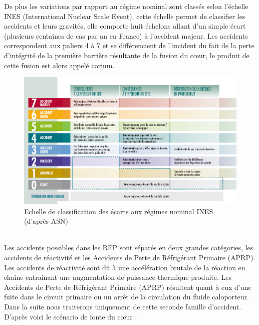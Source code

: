 \documentclass[a4paper,11pt,fleqn]{report}    %
\begin{document}
De plus les variations par rapport au régime nominal sont classés selon l'échelle INES (International Nuclear Scale Event), cette échelle permet de classifier les accidents et leurs gravités, elle comporte huit échelons allant d'un simple écart (plusieurs centaines de cas par an en France) à l'accident majeur. Les accidents correspondent aux paliers 4 à 7 et se différencient de l'incident du fait de la perte d'intégrité de la première barrière résultante de la fusion du c\oe ur, le produit de cette fusion est alors appelé corium.
\begin{figure}[h!]
	\centering
	\includegraphics[width=0.7\linewidth]{figure/echelle-ines-article}
	\caption[Echelle de classification des écarts aux régimes nominal INES]{Echelle de classification des écarts aux régimes nominal INES (d'après ASN)}
	\label{fig:echelle-ines-article}
\end{figure}\\
Les accidents possibles dans les REP sont séparés en deux grandes catégories, les accidents de réactivité et les Accidents de Perte de Réfrigérant Primaire (APRP). Les accidents de réactivité sont dû à une accélération brutale de la réaction en chaîne entraînant une augmentation de puissance thermique produite. Les Accidents de Perte de Réfrigérant Primaire (APRP) résultent quant à eux d'une fuite dans le circuit primaire ou un arrêt de la circulation du fluide caloporteur. Dans la suite nous traiterons uniquement de cette seconde famille d'accident.
D'après \cite{kolev_multiphase_2015} voici le scénario de fonte du c\oe ur :
\end{document}

